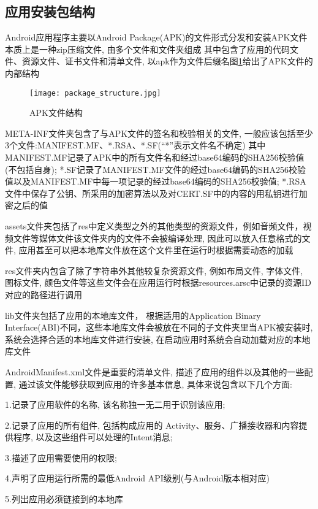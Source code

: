 \subsection{应用安装包结构}
Android应用程序主要以Android Package(APK)的文件形式分发和安装\juhao APK文件本质上是一种zip压缩文件, 由多个文件和文件夹组成 其中包含了应用的代码文件、资源文件、证书文件和清单文件, 以apk作为文件后缀名\juhao 图\ref{packageStructure}给出了APK文件的内部结构\juhao
\begin{figure}[ht]
	\centering
	\texttt{[image: package\_structure.jpg]}
	\caption{APK文件结构}
	\label{packageStructure}
\end{figure}

META-INF文件夹包含了与APK文件的签名和校验相关的文件, 一般应该包括至少3个文件:MANIFEST.MF、*.RSA、*.SF(“*”表示文件名不确定)\juhao 
其中MANIFEST.MF记录了APK中的所有文件名和经过base64编码的SHA256校验值(不包括自身);
*.SF记录了MANIFEST.MF文件的经过base64编码的SHA256校验值以及MANIFEST.MF中每一项记录的经过base64编码的SHA256校验值;
*.RSA文件中保存了公钥、所采用的加密算法以及对CERT.SF中的内容的用私钥进行加密之后的值\juhao

assets文件夹包括了res中定义类型之外的其他类型的资源文件，例如音频文件，视频文件等媒体文件\juhao 该文件夹内的文件不会被编译处理, 因此可以放入任意格式的文件, 应用甚至可以把本地库文件放在这个文件里在运行时根据需要动态的加载\juhao

res文件夹内包含了除了字符串外其他较复杂资源文件, 例如布局文件, 字体文件, 图标文件, 颜色文件等\juhao 这些文件会在应用运行时根据resources.arsc中记录的资源ID对应的路径进行调用\juhao

lib文件夹包括了应用的本地库文件， 根据适用的Application Binary Interface(ABI)不同，这些本地库文件会被放在不同的子文件夹里\juhao 当APK被安装时, 系统会选择合适的本地库文件进行安装, 在启动应用时系统会自动加载对应的本地库文件\juhao

AndroidManifest.xml文件是重要的清单文件, 描述了应用的组件以及其他的一些配置, 通过该文件能够获取到应用的许多基本信息, 具体来说包含以下几个方面:

1.记录了应用软件的名称, 该名称独一无二用于识别该应用;

2.记录了应用的所有组件, 包括构成应用的 Activity、服务、广播接收器和内容提供程序, 以及这些组件可以处理的Intent消息;

3.描述了应用需要使用的权限;

4.声明了应用运行所需的最低Android API级别(与Android版本相对应)

5.列出应用必须链接到的本地库

